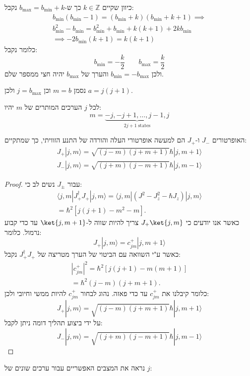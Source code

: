 \documentclass{tstextbook}
\begin{document}
\begin{corollary}
כיוון שקיים \(k \in \mathbb{Z}\) כך ש-\(b_{\max}=b_{\text{min}}+k\) נקבל:
\begin{gather*}b_{\min}\left( b_{\min}-1 \right)=\left( b_{\min}+k \right)\left( b_{\min}+k+1 \right)\implies \\ b_{\min}^{2}-b_{\min}=b_{\min}^{2}+b_{\min}+k(k+1)+2kb_{\min}\\ \implies -2b_{\min}(k+1)=k(k+1) 
\end{gather*}
כלומר נקבל:
$$b_{\min}=-\frac{k}{2}\qquad b_{\max}=\frac{k}{2}$$
ולכן \(b_{\text{min}}=-b_{\text{max}}\) והערך של \(b_{\text{max}}\) יהיה חצי ממספר שלם.

\end{corollary}
\begin{symbolize}
נסמן \(m=b\) וכן \(j=b_{\text{max}}\) ולכן \(a=j(j+1)\). 

\end{symbolize}
\begin{corollary}
לכל \(j\) הערכים המותרים של \(m\) יהיו:
$$m=\underbrace{-j,-j+1,\ldots,j-1,j}_{2j+1\;{\mathrm{states}}}$$

\end{corollary}
\begin{proposition}
האופרטורים \(J_{-}\) ו-\(J_{+}\) הם למעשה אופרטורי העלה והורדה של התנע הזוויתי, כך שמתקיים:
\begin{gather*}J_{+}|j,m\rangle=\sqrt{(j-m)(j+m+1)}\hbar|j,m+1\rangle\\J_{-}|j,m\rangle=\sqrt{(j+m)(j-m+1)}\hbar|j,m-1\rangle 
\end{gather*}

\end{proposition}
\begin{proof}
עבור \(J_{\pm}\) נשים לב כי:
$$\begin{array}{c}{{\langle j,m|J_{+}^{\dagger}J_{+}|j,m\rangle=\langle j,m|(J^{2}-J_{z}^{2}-\hbar J_{z})|j,m\rangle}}\\ {{=\hbar^{2}[j(j+1)-m^{2}-m].}}\end{array}$$
כאשר אנו יודעים כי \(J_{+}\ket{ j,m}\) צריך להיות שווה ל-\(\ket{j,m+1}\) עד כדי קבוע נרמול. כלומר:
$$J_{+}|j,m\rangle=c_{j m}^{+}|j,m+1\rangle$$
כאשר ע"י השוואה עם הביטוי של הערך מטריצה של \(J_{+}^{\dagger}J_{+}\) נקבל:
$$\begin{array}{c}{{|c_{j m}^{+}|^{2}=\hbar^{2}[j(j+1)-m(m+1)]}}\\ {{=\hbar^{2}(j-m)(j+m+1).}}\end{array}$$
כלומר קיבלנו את \(c_{jm}^{+}\) עד כדי פאזה. נהוג לבחור \(c_{jm}^{+}\) להיות ממשי וחיובי ולכן:
$$J_{+}|j,m\rangle=\sqrt{(j-m)(j+m+1)}\hbar|j,m+1\rangle$$
על ידי ביצוע תהליך דומה ניתן לקבל:
$$J_{-}|j,m\rangle=\sqrt{(j+m)(j-m+1)}\hbar|j,m-1\rangle$$

\end{proof}
נראה את המצבים האפשריים עבור ערכים שונים של \(j\):
\end{document}
